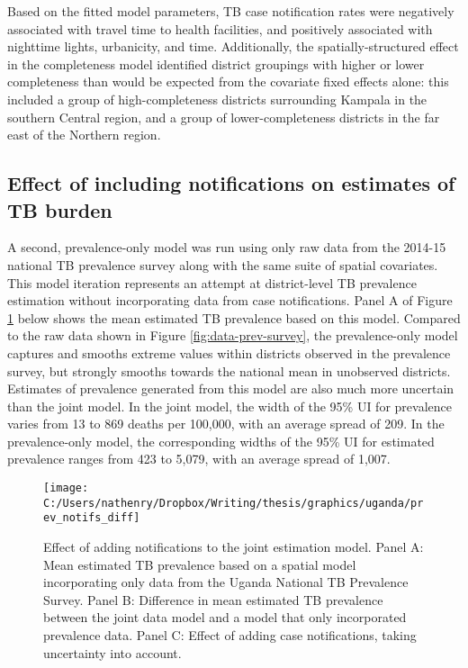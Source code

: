 \documentclass[
]{article}
\begin{document}
Based on the fitted model parameters, TB case notification rates were negatively associated with travel time to health facilities, and positively associated with nighttime lights, urbanicity, and time. Additionally, the spatially-structured effect in the completeness model identified district groupings with higher or lower completeness than would be expected from the covariate fixed effects alone: this included a group of high-completeness districts surrounding Kampala in the southern Central region, and a group of lower-completeness districts in the far east of the Northern region.

\hypertarget{effect-of-including-notifications-on-estimates-of-tb-burden}{%
\subsection{Effect of including notifications on estimates of TB burden}\label{effect-of-including-notifications-on-estimates-of-tb-burden}}

A second, prevalence-only model was run using only raw data from the 2014-15 national TB prevalence survey along with the same suite of spatial covariates. This model iteration represents an attempt at district-level TB prevalence estimation without incorporating data from case notifications. Panel A of Figure \ref{fig:prev-notifs-diff} below shows the mean estimated TB prevalence based on this model. Compared to the raw data shown in Figure \ref{fig:data-prev-survey}, the prevalence-only model captures and smooths extreme values within districts observed in the prevalence survey, but strongly smooths towards the national mean in unobserved districts. Estimates of prevalence generated from this model are also much more uncertain than the joint model. In the joint model, the width of the 95\% UI for prevalence varies from 13 to 869 deaths per 100,000, with an average spread of 209. In the prevalence-only model, the corresponding widths of the 95\% UI for estimated prevalence ranges from 423 to 5,079, with an average spread of 1,007.

\begin{figure}[!ht]

{\centering \texttt{[image: C:/Users/nathenry/Dropbox/Writing/thesis/graphics/uganda/prev\_notifs\_diff]} 

}

\caption{Effect of adding notifications to the joint estimation model. Panel A: Mean estimated TB prevalence based on a spatial model incorporating only data from the Uganda National TB Prevalence Survey. Panel B: Difference in mean estimated TB prevalence between the joint data model and a model that only incorporated prevalence data. Panel C: Effect of adding case notifications, taking uncertainty into account.}\label{fig:prev-notifs-diff}
\end{figure}
\end{document}
